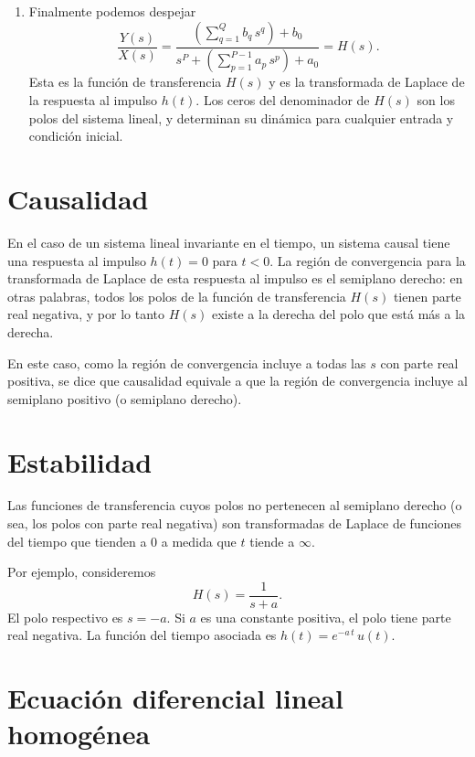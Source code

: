 \documentclass[11pt,a4paper,openany]{book}
\begin{document}
\begin{enumerate}
	\item Finalmente podemos despejar
	\begin{equation}
		\frac{Y(s)}{X(s)} = \frac{\left(\sum_{q=1}^{Q}b_{q} \, s^{q}\right) + 
			b_{0}}{s^{P}  +
			\left(\sum_{p=1}^{P-1}a_{p} \, s^{p}\right) + 
			a_{0}} = H(s).
		\label{conv.difeq.5}
	\end{equation}
	Esta es la función de transferencia $H(s)$ y es la transformada de Laplace de la respuesta al impulso $h(t)$. Los ceros del denominador de $H(s)$ son los polos del sistema lineal, y determinan su dinámica para cualquier entrada y condición inicial.
\end{enumerate}

\section{Causalidad}

En el caso de un sistema lineal invariante en el tiempo, un sistema causal tiene una respuesta al impulso $h(t) = 0$ para $t < 0$. La región de convergencia para la transformada de Laplace de esta respuesta al impulso es el semiplano derecho: en otras palabras, todos los polos de la función de transferencia $H(s)$ tienen parte real negativa, y por lo tanto $H(s)$ existe a la derecha del polo que está más a la derecha.

En este caso, como la región de convergencia incluye a todas las $s$ con parte real positiva, se dice que causalidad equivale a que la región de convergencia incluye al semiplano positivo (o semiplano derecho).

\section{Estabilidad}

Las funciones de transferencia cuyos polos no pertenecen al semiplano derecho (o sea, los polos con parte real negativa) son transformadas de Laplace de funciones del tiempo que tienden a $0$ a medida que $t$ tiende a $\infty$.

Por ejemplo, consideremos
\begin{equation}
	H(s) = \frac{1}{s + a}.
\end{equation}
El polo respectivo es $s=-a$. Si $a$ es una constante positiva, el polo tiene parte real negativa. La funci\'{o}n del tiempo asociada es $h(t) = e^{-a \, t} \, u(t)$.

\section{Ecuaci\'{o}n diferencial lineal homog\'{e}nea}
\end{document}
